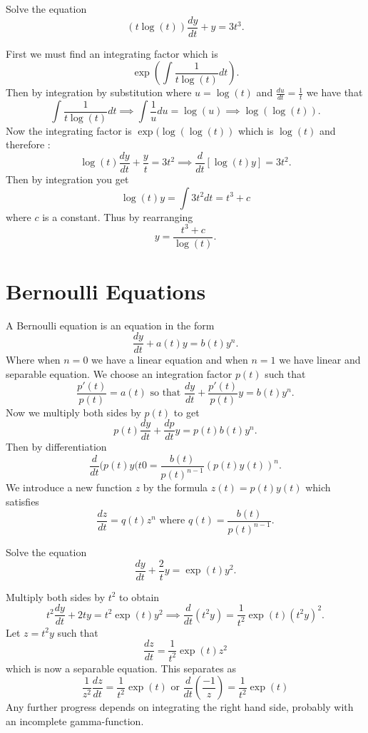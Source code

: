 \bigskip

\begin{example}  Solve the equation $$(t\log(t))\frac{dy}{dt} + y = 3t^3.$$
\begin{solution}
First we must find an integrating factor which is $$\exp( \int \frac{1}{t\log(t)} dt).$$ Then by integration by substitution where $u = \log(t)$ and $\frac{du}{dt} = \frac{1}{t}$ we have that $$\int \frac{1}{t\log(t)} dt \implies \int \frac{1}{u}du = \log(u) \implies \log(\log(t)).$$
Now the integrating factor is $\exp(\log(\log(t))$ which is $\log(t)$ and therefore : $$\log(t)\frac{dy}{dt} + \frac{y}{t} = 3t^2 \implies \frac{d}{dt}[\log(t)y] = 3t^2.$$ Then by integration you get $$\log(t)y = \int3t^2 dt = t^3 + c$$ where $c$ is a constant. Thus by rearranging $$y = \frac{t^3 + c}{\log(t)}.$$
\end{solution}
\end{example}

\bigskip

\section{Bernoulli Equations}
A Bernoulli equation is an equation in the form $$\frac{dy}{dt} + a(t)y = b(t)y^n.$$
Where when $n = 0$ we have a linear equation and when $n = 1$ we have  linear and separable equation. We choose an integration factor $p(t)$ such that $$\frac{p'(t)}{p(t)} = a(t) \mbox{ so that } \frac{dy}{dt} + \frac{p'(t)}{p(t)}y = b(t)y^n.$$
Now we multiply both sides by $p(t)$ to get $$p(t)\frac{dy}{dt} + \frac{dp}{dt}y = p(t)b(t)y^n.$$ Then by differentiation $$\frac{d}{dt}(p(t)y(t0 = \frac{b(t)}{p(t)^{n-1}}(p(t)y(t))^n.$$ We introduce a new function $z$ by the formula $z(t) = p(t)y(t)$ which satisfies $$\frac{dz}{dt} = q(t)z^n \mbox{ where } q(t) = \frac{b(t)}{p(t)^{n-1}}.$$

\begin{example}
Solve the equation $$\frac{dy}{dt} + \frac{2}{t}y = \exp(t)y^2.$$
\begin{solution}
Multiply both sides by $t^2$ to obtain $$t^2\frac{dy}{dt} + 2ty = t^2\exp(t)y^2 \implies \frac{d}{dt}(t^2y) = \frac{1}{t^2}\exp(t)(t^2y)^2.$$ Let $z = t^2y$ such that $$\frac{dz}{dt}=\frac{1}{t^2}\exp(t)z^2$$ which is now a separable equation. This separates as $$\frac{1}{z^2}\frac{dz}{dt} = \frac{1}{t^2}\exp(t) \mbox{ or } \frac{d}{dt}(\frac{-1}{z}) = \frac{1}{t^2}\exp(t)$$ Any further progress depends on integrating the right hand side, probably with an incomplete gamma-function.
\end{solution}
\end{example}
\bigskip

